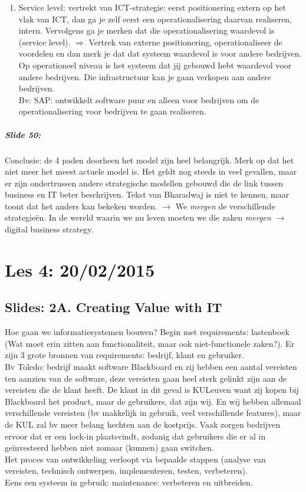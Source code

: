 \documentclass[10pt,a4paper]{report}
\begin{document}
\begin{enumerate}
\item Service level: vertrekt van ICT-strategie: eerst positionering extern op het vlak van ICT, dan ga je zelf eerst een operationalisering daarvan realiseren, intern. 
Vervolgens ga je merken dat die operationalisering waardevol is (service level). $\Rightarrow$ 
Vertrek van externe positionering, operationaliseer de voordelen en dan merk je dat dat systeem waardevol is voor andere bedrijven. 
Op operationeel niveau is het systeem dat jij gebouwd hebt waardevol voor andere bedrijven. Die infrastructuur kan je gaan verkopen aan andere bedrijven.\\ 
Bv: SAP: ontwikkelt software puur en alleen voor bedrijven om de operationalisering voor bedrijven te gaan realiseren.
\end{enumerate}

\paragraph{Slide 50:}Conclusie: de 4 paden doorheen het model zijn heel belangrijk. Merk op dat het niet meer het meest actuele model is. Het geldt nog steeds in veel gevallen, maar er zijn ondertrussen andere strategische modellen gebouwd die de link tussen business en IT beter beschrijven. Tekst van Bharadwaj is niet te kennen, maar toont dat het anders kan bekeken worden. $\rightarrow$ We \textit{mergen} de verschillende strategieën. In de wereld waarin we nu leven moeten we die zaken \textit{mergen} $\rightarrow$ digital business strategy.

\chapter{Les 4: 20/02/2015}
\section{Slides: 2A. Creating Value with IT}
Hoe gaan we informatiesystemen bouwen? Begin met requirements: lastenboek (Wat moet erin zitten aan functionaliteit, maar ook niet-functionele zaken?). Er zijn 3 grote bronnen van requirements: bedrijf, klant en gebruiker.\\
Bv Toledo: bedrijf maakt software Blackboard en zij hebben een aantal vereisten ten aanzien van de software, deze vereisten gaan heel sterk gelinkt zijn aan de vereisten die de klant heeft. 
De klant in dit geval is KULeuven want zij kopen bij Blackboard het product, maar de gebruikers, dat zijn wij. 
En wij hebben allemaal verschillende vereisten (bv makkelijk in gebruik, veel verschillende features), maar de KUL zal bv meer belang hechten aan de kostprijs. 
Vaak zorgen bedrijven ervoor dat er een lock-in plaatsvindt, zodanig dat gebruikers die er al in geïnvesteerd hebben niet zomaar (kunnen) gaan switchen.\\
Het proces van ontwikkeling verloopt via bepaalde stappen (analyse van vereisten, technisch ontwerpen, implementeren, testen, verbeteren).\\ Eens een systeem in gebruik: maintenance: verbeteren en uitbreiden. 
\end{document}
